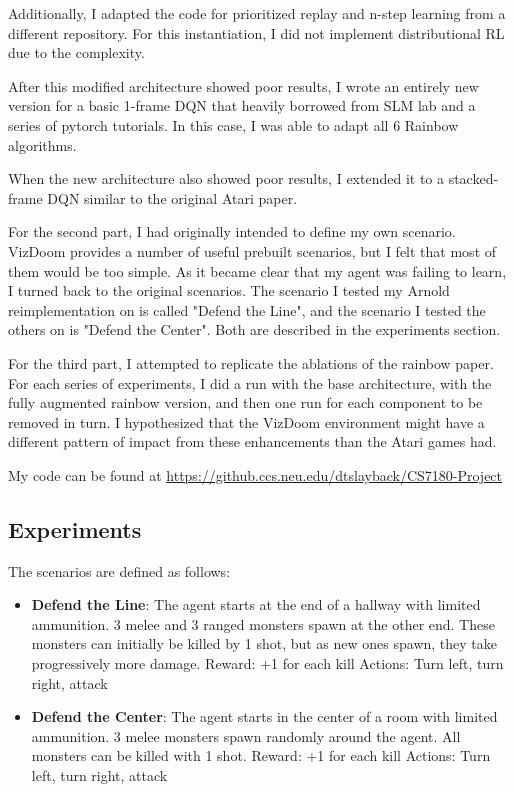 \documentclass[letterpaper]{article}
\begin{document}
	Additionally, I adapted the code for prioritized replay and n-step learning from a different repository\cite{kaixhin2018}. For this instantiation, I did not implement distributional RL due to the complexity.
	
	After this modified architecture showed poor results, I wrote an entirely new version for a basic 1-frame DQN that heavily borrowed from SLM lab\cite{kenggraesser2017slmlab} and a series of pytorch tutorials\cite{fettes2018}. In this case, I was able to adapt all 6 Rainbow algorithms.
	
	When the new architecture also showed poor results, I extended it to a stacked-frame DQN similar to the original Atari paper. 
	
	For the second part, I had originally intended to define my own scenario. VizDoom provides a number of useful prebuilt scenarios, but I felt that most of them would be too simple. As it became clear that my agent was failing to learn, I turned back to the original scenarios. The scenario I tested my Arnold reimplementation on is called "Defend the Line", and the scenario I tested the others on is "Defend the Center". Both are described in the experiments section.
	
	For the third part, I attempted to replicate the ablations of the rainbow paper. For each series of experiments, I did a run with the base architecture, with the fully augmented rainbow version, and then one run for each component to be removed in turn. I hypothesized that the VizDoom environment might have a different pattern of impact from these enhancements than the Atari games had. 
	
	My code can be found at \url{https://github.ccs.neu.edu/dtslayback/CS7180-Project}
	 
	\subsection{Experiments}
	
	The scenarios are defined as follows:
	\begin{itemize}
		\item \textbf{Defend the Line}: The agent starts at the end of a hallway with limited ammunition. 3 melee and 3 ranged monsters spawn at the other end. These monsters can initially be killed by 1 shot, but as new ones spawn, they take progressively more damage.
		\subitem Reward: +1 for each kill
		\subitem Actions: Turn left, turn right, attack
		\item \textbf{Defend the Center}: The agent starts in the center of a room with limited ammunition. 3 melee monsters spawn randomly around the agent. All monsters can be killed with 1 shot.
		\subitem Reward: +1 for each kill
		\subitem Actions: Turn left, turn right, attack
	\end{itemize}
\end{document}
